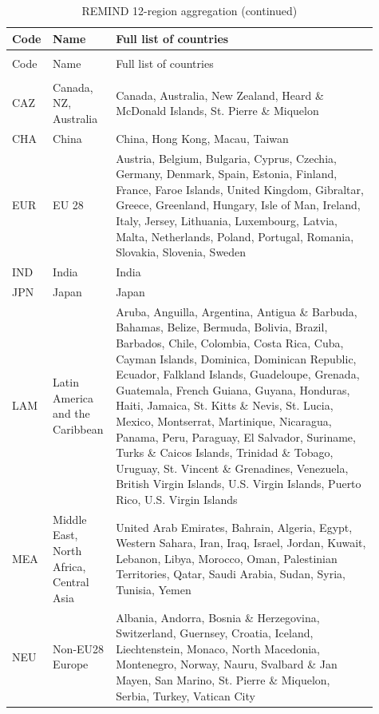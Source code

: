 \begin{longtable}{>{\raggedright\arraybackslash}p{0.06\linewidth}>{\raggedright\arraybackslash}p{0.15\linewidth}>{\raggedright\arraybackslash}p{0.7\linewidth}}
\caption{REMIND 12-region aggregation}\label{tab:regions_h12}\\
\toprule
Code & Name & Full list of countries \\
\midrule
\endfirsthead
\caption{REMIND 12-region aggregation (continued)}\\
\toprule
Code & Name & Full list of countries \\
\midrule
\endhead
\midrule
\multicolumn{2}{r}{Continued on next page} \\
\endfoot
\bottomrule
\endlastfoot
CAZ & Canada, NZ, Australia & Canada, Australia, New Zealand, Heard \& McDonald Islands, St. Pierre \& Miquelon \\
CHA & China & China, Hong Kong, Macau, Taiwan \\
EUR & EU 28 & Austria, Belgium, Bulgaria, Cyprus, Czechia, Germany, Denmark, Spain, Estonia, Finland, France, Faroe Islands, United Kingdom, Gibraltar, Greece, Greenland, Hungary, Isle of Man, Ireland, Italy, Jersey, Lithuania, Luxembourg, Latvia, Malta, Netherlands, Poland, Portugal, Romania, Slovakia, Slovenia, Sweden \\
IND & India & India \\
JPN & Japan & Japan \\
LAM & Latin America and the Caribbean & Aruba, Anguilla, Argentina, Antigua \& Barbuda, Bahamas, Belize, Bermuda, Bolivia, Brazil, Barbados, Chile, Colombia, Costa Rica, Cuba, Cayman Islands, Dominica, Dominican Republic, Ecuador, Falkland Islands, Guadeloupe, Grenada, Guatemala, French Guiana, Guyana, Honduras, Haiti, Jamaica, St. Kitts \& Nevis, St. Lucia, Mexico, Montserrat, Martinique, Nicaragua, Panama, Peru, Paraguay, El Salvador, Suriname, Turks \& Caicos Islands, Trinidad \& Tobago, Uruguay, St. Vincent \& Grenadines, Venezuela, British Virgin Islands, U.S. Virgin Islands, Puerto Rico, U.S. Virgin Islands \\
MEA & Middle East, North Africa, Central Asia & United Arab Emirates, Bahrain, Algeria, Egypt, Western Sahara, Iran, Iraq, Israel, Jordan, Kuwait, Lebanon, Libya, Morocco, Oman, Palestinian Territories, Qatar, Saudi Arabia, Sudan, Syria, Tunisia, Yemen \\
NEU & Non-EU28 Europe & Albania, Andorra, Bosnia \& Herzegovina, Switzerland, Guernsey, Croatia, Iceland, Liechtenstein, Monaco, North Macedonia, Montenegro, Norway, Nauru, Svalbard \& Jan Mayen, San Marino, St. Pierre \& Miquelon, Serbia, Turkey, Vatican City \\

\end{longtable}

